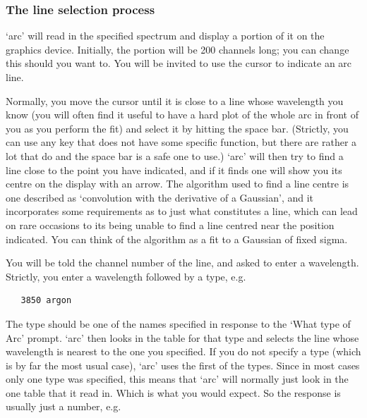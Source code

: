 
\subsubsection{\label{techno10select}The line selection process}

   `arc' will read in the specified spectrum and display a portion of it
   on the graphics device.  Initially, the portion will be 200 channels
   long; you can change this should you want to.  You will be invited to
   use the cursor to indicate an arc line.

   Normally, you move the cursor until it is close to a line whose
   wavelength you know (you will often find it useful to have a hard
   plot of the whole arc in front of you as you perform the fit) and
   select it by hitting the space bar.  (Strictly, you can use any key
   that does not have some specific function, but there are rather a lot
   that do and the space bar is a safe one to use.)  `arc' will then try
   to find a line close to the point you have indicated, and if it finds
   one will show you its centre on the display with an arrow.  The
   algorithm used to find a line centre is one described as `convolution
   with the derivative of a Gaussian', and it incorporates some
   requirements as to just what constitutes a line, which can lead on
   rare occasions to its being unable to find a line centred near the
   position indicated.  You can think of the algorithm as a fit to a
   Gaussian of fixed sigma.

   You will be told the channel number of the line, and asked to enter a
   wavelength.  Strictly, you enter a wavelength followed by a type, e.g.

\begin{verbatim}
   3850 argon
\end{verbatim}

   The type should be one of the names specified in response to the
   `What type of Arc' prompt.  `arc' then looks in the table for that
   type and selects the line whose wavelength is nearest to the one you
   specified. If you do not specify a type (which is by far the most
   usual case), `arc' uses the first of the types.  Since in most cases
   only one type was specified, this means that `arc' will normally just
   look in the one table that it read in.  Which is what you would
   expect.  So the response is usually just a number, e.g.

